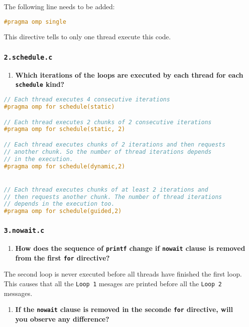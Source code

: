 \documentclass[a4paper]{article}
\begin{document}
The following line needs to be added:
\begin{lstlisting}[language=C]
#pragma omp single
\end{lstlisting}
This directive tells to only one thread execute this code.

\subsubsection{\texttt{2.schedule.c}}

\begin{enumerate}
	\item \textbf{Which iterations of the loops are executed by each thread for each \texttt{schedule} kind?}
\end{enumerate}

\begin{lstlisting}[language=C]
// Each thread executes 4 consecutive iterations
#pragma omp for schedule(static)

// Each thread executes 2 chunks of 2 consecutive iterations
#pragma omp for schedule(static, 2)

// Each thread executes chunks of 2 iterations and then requests 
// another chunk. So the number of thread iterations depends 
// in the execution.
#pragma omp for schedule(dynamic,2)


// Each thread executes chunks of at least 2 iterations and 
// then requests another chunk. The number of thread iterations 
// depends in the execution too.
#pragma omp for schedule(guided,2)
\end{lstlisting}

\subsubsection{\texttt{3.nowait.c}}

\begin{enumerate}
	\item \textbf{How does the sequence of \texttt{printf} change if \texttt{nowait} clause is removed from the first \texttt{for} directive?}
\end{enumerate}

The second loop is never executed before all threads have finished the first loop. This causes that all the \verb|Loop 1| mesages are printed before all the \verb|Loop 2| messages.

\begin{enumerate}[resume]
	\item \textbf{If the \texttt{nowait} clause is removed in the seconde \texttt{for} directive, will you observe any difference?}
\end{enumerate}
\end{document}
